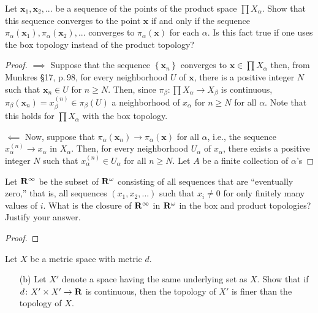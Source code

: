 \newpage
\begin{problem}[Munkres \S19, p.\,118, \#6]
Let $\mathbf{x}_1,\mathbf{x}_2,...$ be a sequence of the points
of the product space $\prod X_\alpha$. Show that this sequence
converges to the point $\mathbf{x}$ if and only if the sequence
$\pi_\alpha(\mathbf{x}_1),\pi_\alpha(\mathbf{x}_2),...$ converges
to $\pi_\alpha(\mathbf{x})$ for each $\alpha$. Is this fact true
if one uses the box topology instead of the product topology?
\end{problem}
\begin{proof}
$\implies$ Suppose that the sequence
$\left\{\mathbf{x}_n\right\}$ converges to $\mathbf{x}\in\prod
X_\alpha$ then, from Munkres \S17, p.\,98, for every neighborhood
$U$ of $\mathbf{x}$, there is a positive integer $N$ such that
$\mathbf{x}_n\in U$ for $n\geq N$. Then, since
$\pi_\beta\colon\prod X_\alpha\to X_\beta$ is continuous,
$\pi_\beta(\mathbf{x}_n)=x_\beta^{(n)}\in\pi_\beta(U)$ a
neighborhood of $x_\alpha$ for $n\geq N$ for all $\alpha$. Note
that this holds for $\prod X_\alpha$ with the box topology.

$\impliedby$ Now, suppose that
$\pi_\alpha(\mathbf{x}_n)\to\pi_\alpha(\mathbf{x})$ for all
$\alpha$, i.e., the sequence $x_\alpha^{(n)}\to x_\alpha$ in
$X_\alpha$. Then, for every neighborhood $U_\alpha$ of
$x_\alpha$, there exists a positive integer $N$ such that
$x_\alpha^{(n)}\in U_\alpha$ for all $n\geq N$. Let $A$ be a
finite collection of $\alpha$'s
\end{proof}
\newpage
\begin{problem}[Munkres \S19, p.\,118, \#7]
Let $\mathbf{R}^\infty$ be the subset of $\mathbf{R}^\omega$ consisting of all
sequences that are ``eventually zero,'' that is, all sequences
$(x_1,x_2,...)$ such that $x_i\neq 0$ for only finitely many
values of $i$. What is the closure of $\mathbf{R}^\infty$ in
$\mathbf{R}^\omega$ in the box and product topologies? Justify your
answer.
\end{problem}
\begin{proof}
\end{proof}
\newpage
\begin{problem}[Munkres \S20, p.\,126, \#3(b)]
Let $X$ be a metric space with metric $d$.
\begin{enumerate}[noitemsep]
\item[(b)] Let $X'$ denote a space having the same underlying set
  as $X$. Show that if $d\colon X'\times X'\to\mathbf{R}$ is continuous,
  then the topology of $X'$ is finer than the topology of $X$.
\end{enumerate}
\end{problem}
